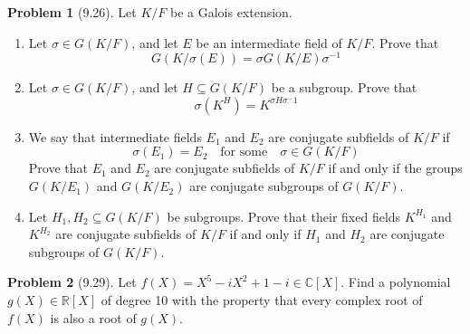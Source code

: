 \documentclass[12pt]{article}
\theoremstyle{definition}
\newtheorem{problem}{Problem}
\begin{document}
\begin{problem}[9.26]
    Let $K/F$ be a Galois extension.
    \begin{enumerate}[label=(\alph*)]
        \item Let $\sigma \in G(K/F)$, and let $E$ be an intermediate field of $K/F$. Prove that
              \[ 
                 G(K/\sigma(E)) = \sigma G(K/E)\sigma^{-1}
              \]
        \begin{solution}

        \end{solution}

        \item Let $\sigma \in G(K/F)$, and let $H \subseteq G(K/F)$ be a subgroup. Prove that
              \[
                    \sigma(K^H) = K^{\sigma H \sigma^-1}
              \]
        \begin{solution}

        \end{solution}

        \item We say that intermediate fields $E_1$ and $E_2$ are conjugate subfields of $K/F$ if
              \[
                    \sigma(E_1) = E_2 \quad \text{for some} \quad \sigma \in G(K/F)
              \]
              Prove that $E_1$ and $E_2$ are conjugate subfields of $K/F$ if and only if the groups $G(K/E_1)$ and $G(K/E_2)$ are conjugate subgroups of $G(K/F)$.
        \begin{solution}

        \end{solution}

        \item Let $H_1, H_2 \subseteq G(K/F)$ be subgroups. Prove that their fixed fields $K^{H_1}$ and $K^{H_2}$
              are conjugate subfields of $K/F$ if and only if $H_1$ and $H_2$ are conjugate subgroups of $G(K/F)$.
    \end{enumerate}
\end{problem}

\begin{problem}[9.29]
    Let $f(X) = X^5 - iX^2 + 1 - i \in \mathbb{C}[X]$. Find a polynomial $g(X) \in \mathbb{R}[X]$
    of degree 10 with the property that every complex root of $f(X)$ is also a root of $g(X)$.
    \begin{solution}

    \end{solution}
\end{problem}
\end{document}
